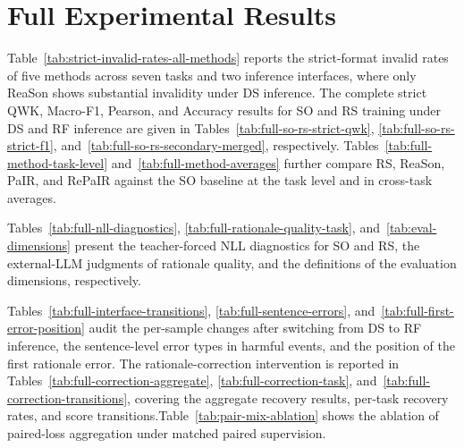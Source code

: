 \section{Full Experimental Results}
\label{app:full-results}

Table~\ref{tab:strict-invalid-rates-all-methods} reports the strict-format
invalid rates of five methods across seven tasks and two inference
interfaces, where only ReaSon shows substantial invalidity under DS
inference. The complete strict QWK, Macro-F1, Pearson, and Accuracy results
for SO and RS training under DS and RF inference are given in
Tables~\ref{tab:full-so-rs-strict-qwk}, \ref{tab:full-so-rs-strict-f1},
and~\ref{tab:full-so-rs-secondary-merged}, respectively.
Tables~\ref{tab:full-method-task-level} and~\ref{tab:full-method-averages}
further compare RS, ReaSon, PaIR, and RePaIR against the SO baseline at the
task level and in cross-task averages.

Tables~\ref{tab:full-nll-diagnostics}, \ref{tab:full-rationale-quality-task},
and~\ref{tab:eval-dimensions} present the teacher-forced NLL diagnostics for
SO and RS, the external-LLM judgments of rationale quality, and the
definitions of the evaluation dimensions, respectively.

Tables~\ref{tab:full-interface-transitions}, \ref{tab:full-sentence-errors},
and~\ref{tab:full-first-error-position} audit the per-sample changes after
switching from DS to RF inference, the sentence-level error types in harmful
events, and the position of the first rationale error.
The rationale-correction intervention is reported in
Tables~\ref{tab:full-correction-aggregate},
\ref{tab:full-correction-task}, and~\ref{tab:full-correction-transitions},
covering the aggregate recovery results, per-task recovery rates, and score
transitions.Table~\ref{tab:pair-mix-ablation} shows the ablation of paired-loss
aggregation under matched paired supervision.
